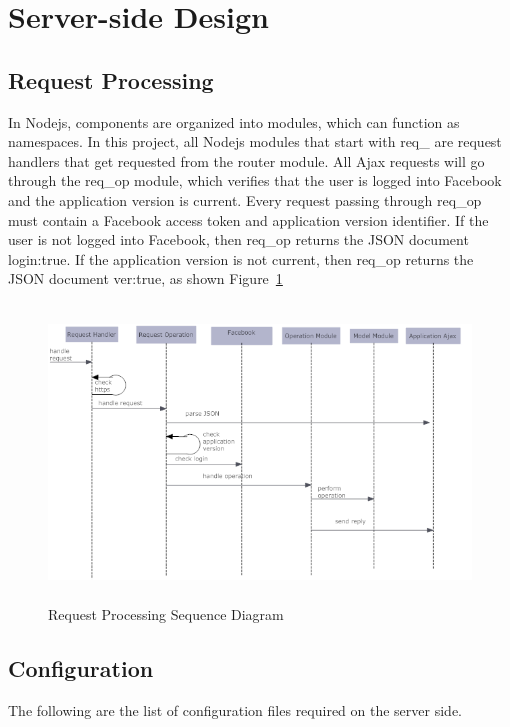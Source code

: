 \section{Server-side Design}

\subsection{Request Processing}
In Nodejs, components are organized into modules, which can function as namespaces. In this project, all Nodejs modules that start with req{\_} are request handlers that get requested from the router module. All Ajax requests will go through the req{\_}op module, which verifies that the user is logged into Facebook and the application version is current. Every request passing through req{\_}op must contain a Facebook access token and application version identifier. If the user is not logged into Facebook, then req{\_}op returns the JSON document {login:true}. If the application version is not current, then req{\_}op returns the JSON document {ver:true}, as shown Figure~\ref{fig:sequence}

\vspace{3em}
\begin{figure}[H]
\begin{center}
\includegraphics[height=3.1in,width=5.5in]{images/sequence.png}
\caption{Request Processing Sequence Diagram}
\label{fig:sequence}
\end{center}
\end{figure}   

\subsection{Configuration}
The following are the list of configuration files required on the server side.

